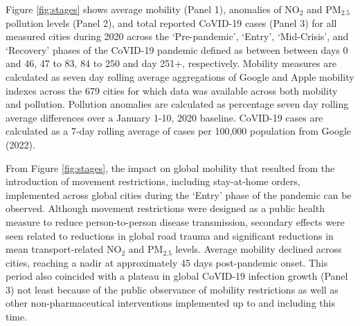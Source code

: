 \documentclass[preprint,12pt]{elsarticle}
\begin{document}
Figure \ref{fig:stages} shows average mobility (Panel 1), anomalies of NO$_{2}$ and PM$_{2.5}$ pollution levels (Panel 2), and total reported CoVID-19 cases (Panel 3) for all measured cities during 2020 across the `Pre-pandemic', `Entry', `Mid-Crisis', and `Recovery' phases of the CoVID-19 pandemic defined as between between days 0 and 46, 47 to 83, 84 to 250 and day 251+, respectively. Mobility measures are calculated as seven day rolling average aggregations of Google and Apple mobility indexes across the 679 cities for which data was available across both mobility and pollution. Pollution anomalies are calculated as percentage seven day rolling average differences over a January 1-10, 2020 baseline. CoVID-19 cases are calculated as a 7-day rolling average of cases per 100,000 population from Google (2022)\cite{Google2022}.

From Figure \ref{fig:stages}, the impact on global mobility that resulted from the introduction of movement restrictions, including stay-at-home orders, implemented across global cities during the `Entry' phase\cite{hale2021global} of the pandemic can be observed. Although movement restrictions were designed as a public health measure to reduce person-to-person disease transmission, secondary effects were seen related to reductions in global road trauma \cite{ITFRS} and significant reductions in mean transport-related NO$_{2}$ and PM$_{2.5}$ levels\cite{zhang2023impact}. Average mobility declined across cities, reaching a nadir at approximately 45 days post-pandemic onset. This period also coincided with a plateau in global CoVID-19 infection growth (Panel 3) not least because of the public observance of mobility restrictions as well as other non-pharmaceutical interventions implemented up to and including this time\cite{hale2021global}. 
\end{document}
